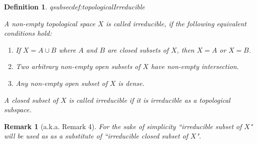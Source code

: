 \documentclass[DIV=14,parskip=full,pointednumbers]{scrartcl}
\newenvironment{alphanumerate}{\begin{enumerate}[label={\upshape(\alph*)},ref=\curthm]}{\end{enumerate}}
\theoremstyle{cthm}
\theoremstyle{cvarthm}
\theoremstyle{cdef}
\newtheorem{defi}{Definition}[subsection]
\newtheorem{rem}{Remark}[subsection]
\newcommand{\lbl}[1]{
	\label{#1}
	\ifmmode
	\expandafter\xdef\csname eqsubsec#1\endcsname{\thesubsection}
	\fi
}
\begin{document}
	\begin{defi}\lbl{def:topologicalIrreducible}
		A non-empty topological space $X$ is called \emph{irreducible},  if the following equivalent conditions hold:
		\begin{alphanumerate}
			\item If $X=A\cup B$ where $A$ and $B$ are closed subsets of $X$, then $X=A$ or $X=B$. 
			\item Two arbitrary non-empty open subsets of $X$ have non-empty intersection.
			\item Any non-empty open subset of $X$ is dense.
		\end{alphanumerate}
		A closed subset of $X$ is called irreducible if it is irreducible as a topological subspace.
	\end{defi}
	\begin{rem}[a.k.a. Remark 4]
		For the sake of simplicity ``irreducible subset of $X$" will be used as as a substitute of ``irreducible closed subset of $X$".
	\end{rem}
	
\end{document}
